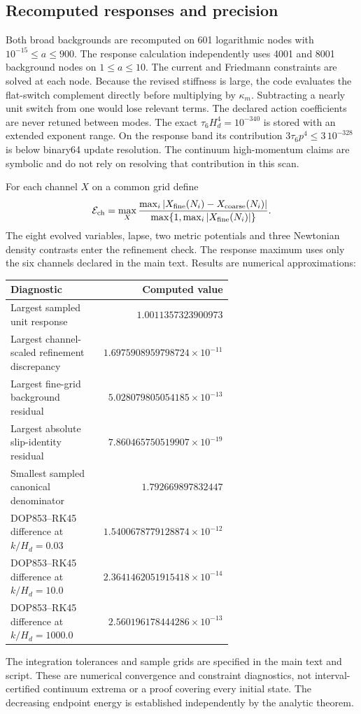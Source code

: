 \documentclass[aps,prd,reprint,onecolumn,notitlepage,nofootinbib,longbibliography,floatfix]{revtex4-2}
\theoremstyle{scstyle}
\theoremstyle{definition}
\theoremstyle{remark}
\newcommand{\kap}{\kappa_m}
\begin{document}
\subsection{Recomputed responses and precision}
Both broad backgrounds are recomputed on 601 logarithmic nodes with $10^{-15}\le a\le900$. The response calculation independently uses 4001 and 8001 background nodes on $1\le a\le10$. The current and Friedmann constraints are solved at each node. Because the revised stiffness is large, the code evaluates the flat-switch complement directly before multiplying by $\kap$. Subtracting a nearly unit switch from one would lose relevant terms. The declared action coefficients are never retuned between modes. The exact $\tau_6H_d^4=10^{-340}$ is stored with an extended exponent range. On the response band its contribution $3\tau_6p^4\le3\,10^{-328}$ is below binary64 update resolution. The continuum high-momentum claims are symbolic and do not rely on resolving that contribution in this scan.

For each channel $X$ on a common grid define
\begin{equation}
 \mathcal E_{\rm ch}=\max_X\frac{\max_i|X_{\rm fine}(N_i)-X_{\rm coarse}(N_i)|}
 {\max\{1,\max_i|X_{\rm fine}(N_i)|\}}.
 \label{eq:independentConvergence}
\end{equation}
The eight evolved variables, lapse, two metric potentials and three Newtonian density contrasts enter the refinement check. The response maximum uses only the six channels declared in the main text. Results are numerical approximations:
\begin{center}\small
\begin{tabular}{p{0.63\linewidth}r}
\toprule Diagnostic & Computed value \\
\midrule
Largest sampled unit response & $1.0011357323900973$ \\
Largest channel-scaled refinement discrepancy & $1.6975908959798724\times10^{-11}$ \\
Largest fine-grid background residual & $5.028079805054185\times10^{-13}$ \\
Largest absolute slip-identity residual & $7.860465750519907\times10^{-19}$ \\
Smallest sampled canonical denominator & $1.792669897832447$ \\
DOP853--RK45 difference at $k/H_d=0.03$ & $1.5400678779128874\times10^{-12}$ \\
DOP853--RK45 difference at $k/H_d=10.0$ & $2.3641462051915418\times10^{-14}$ \\
DOP853--RK45 difference at $k/H_d=1000.0$ & $2.560196178444286\times10^{-13}$ \\
\bottomrule\end{tabular}\end{center}
The integration tolerances and sample grids are specified in the main text and script. These are numerical convergence and constraint diagnostics, not interval-certified continuum extrema or a proof covering every initial state. The decreasing endpoint energy is established independently by the analytic theorem.
\end{document}
